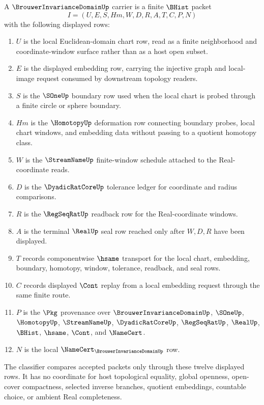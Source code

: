 \begin{definition}
\label{def:brouwer-invariance-domain-carrier}
A $\BrouwerInvarianceDomainUp$ carrier is a finite $\BHist$ packet
$$
I=(U,E,S,Hm,W,D,R,A,T,C,P,N)
$$
with the following displayed rows:
\begin{enumerate}
\item $U$ is the local Euclidean-domain chart row, read as a finite neighborhood and coordinate-window surface rather than as a host open subset.
\item $E$ is the displayed embedding row, carrying the injective graph and local-image request consumed by downstream topology readers.
\item $S$ is the $\SOneUp$ boundary row used when the local chart is probed through a finite circle or sphere boundary.
\item $Hm$ is the $\HomotopyUp$ deformation row connecting boundary probes, local chart windows, and embedding data without passing to a quotient homotopy class.
\item $W$ is the $\StreamNameUp$ finite-window schedule attached to the Real-coordinate reads.
\item $D$ is the $\DyadicRatCoreUp$ tolerance ledger for coordinate and radius comparisons.
\item $R$ is the $\RegSeqRatUp$ readback row for the Real-coordinate windows.
\item $A$ is the terminal $\RealUp$ seal row reached only after $W,D,R$ have been displayed.
\item $T$ records componentwise $\hsame$ transport for the local chart, embedding, boundary, homotopy, window, tolerance, readback, and seal rows.
\item $C$ records displayed $\Cont$ replay from a local embedding request through the same finite route.
\item $P$ is the $\Pkg$ provenance over $\BrouwerInvarianceDomainUp$, $\SOneUp$, $\HomotopyUp$, $\StreamNameUp$, $\DyadicRatCoreUp$, $\RegSeqRatUp$, $\RealUp$, $\BHist$, $\hsame$, $\Cont$, and $\NameCert$.
\item $N$ is the local $\NameCert_{\BrouwerInvarianceDomainUp}$ row.
\end{enumerate}
The classifier compares accepted packets only through these twelve displayed rows. It has no coordinate for host topological equality, global openness, open-cover compactness, selected inverse branches, quotient embeddings, countable choice, or ambient Real completeness.
\end{definition}

